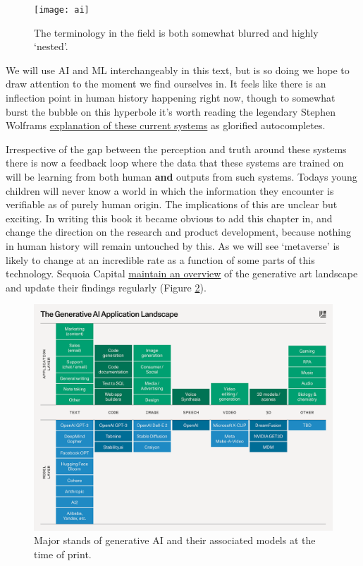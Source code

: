 \begin{figure}[ht]\centering 	\texttt{[image: ai]}
	\caption{The terminology in the field is both somewhat blurred and highly `nested'.}
	\label{fig:aiVenn}
\end{figure}

We will use AI and ML interchangeably in this text, but is so doing we hope to draw attention to the moment we find ourselves in. It feels like there is an inflection point in human history happening right now, though to somewhat burst the bubble on this hyperbole it's worth reading the legendary Stephen Wolframs \href{https://writings.stephenwolfram.com/2023/02/what-is-chatgpt-doing-and-why-does-it-work/}{explanation of these current systems} as glorified autocompletes. \par
Irrespective of the gap between the perception and truth around these systems there is now a feedback loop where the data that these systems are trained on will be learning from both human \textbf{and} outputs from such systems. Todays young children will never know a world in which the information they encounter is verifiable as of purely human origin. The implications of this are unclear but exciting. In writing this book it became obvious to add this chapter in, and change the direction on the research and product development, because nothing in human history will remain untouched by this. As we will see `metaverse' is likely to change at an incredible rate as a function of some parts of this technology. Sequoia Capital \href{https://www.sequoiacap.com/article/generative-ai-a-creative-new-world/}{maintain an overview} of the generative art landscape and update their findings regularly (Figure \ref{fig:sequoiacapLandscape}).
\begin{figure}[ht]\centering 	\includegraphics[width=\linewidth]{images/sequoiacapLandscape}
	\caption{Major stands of generative AI and their associated models at the time of print.}
	\label{fig:sequoiacapLandscape}
\end{figure}

